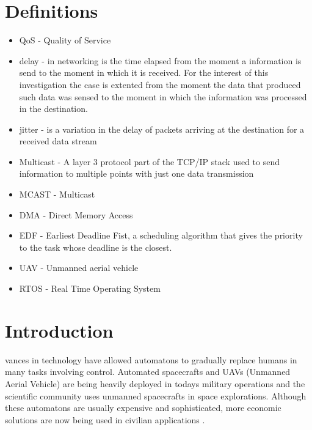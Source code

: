 \documentclass[journal]{IEEEtran}
\begin{document}
\section{Definitions}
\begin{itemize}
\item QoS - Quality of Service
\item delay - in networking is the time elapsed from the moment a information is send to the moment in which it is received. For the interest of this investigation the case is extented from the moment the data that produced such data was sensed to the moment in which the information was processed in the destination.
\item jitter - is a variation in the delay of packets arriving at the destination for a received data stream
\item Multicast - A layer 3 protocol part of the TCP/IP stack used to send information to multiple points with just one data transmission
\item MCAST - Multicast
\item DMA - Direct Memory Access
\item EDF - Earliest Deadline Fist, a scheduling algorithm that gives the priority to the task whose deadline is the closest.
\item UAV - Unmanned aerial vehicle
\item RTOS - Real Time Operating System
\end{itemize}

\section{Introduction}
vances in technology have allowed automatons to gradually replace humans in many tasks involving control. Automated spacecrafts and UAVs (Unmanned Aerial Vehicle) are being heavily deployed in todays military operations and the scientific
community uses unmanned spacecrafts in space explorations. Although these automatons are usually expensive and sophisticated, more economic solutions are now being used in civilian applications \cite{YS1}.
\end{document}
